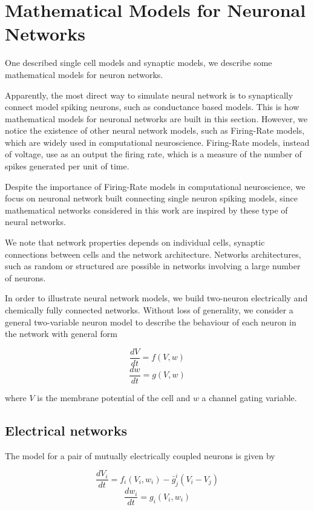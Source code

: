 \section{Mathematical Models for Neuronal Networks}
One described single cell models and synaptic models, we describe some mathematical models for neuron networks.

Apparently, the most direct way to simulate neural network is to synaptically connect model spiking neurons, such as conductance based models. This is how mathematical models for neuronal networks are built in this section. However, we notice the existence of other neural network models, such as Firing-Rate models, which are widely used in computational neuroscience. Firing-Rate models, instead of voltage, use as an output the firing rate, which is a measure of the number of spikes generated per unit of time.

Despite the importance of Firing-Rate models in computational neuroscience, we focus on neuronal network built connecting single neuron spiking models, since mathematical networks considered in this work are inspired by these type of neural networks.

We note that network properties depends on individual cells, synaptic connections between cells and the network architecture. Networks architectures, such as random or structured are possible in networks involving a large number of neurons.

In order to illustrate neural network models, we build two-neuron electrically and chemically fully connected networks. Without loss of generality, we consider a general two-variable neuron model to describe the behaviour of each neuron in the network with general form

\begin{equation}
    \frac{dV}{dt}  = f(V,w)
\end{equation}
\begin{equation}
    \frac{dw}{dt}  = g(V,w)
\end{equation}

where $V$ is the membrane potential of the cell and $w$ a channel gating variable.

\subsection{Electrical networks}
The model for a pair of mutually electrically coupled neurons is given by

\begin{equation}
    \frac{dV_{i}}{dt}  = f_{i}(V_{i},w_{i}) - \bar{g}_{j}^{i}(V_{i}-V_{j})
\end{equation}
\begin{equation}
    \frac{dw_{i}}{dt}  = g_{i}(V_{i},w_{i})
\end{equation}

